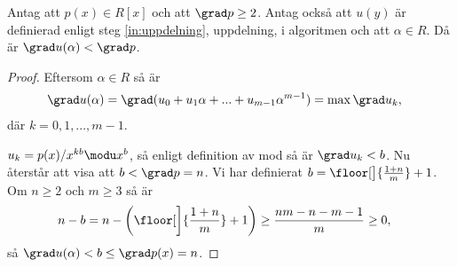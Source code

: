 \begin{lemma}
  \label{lemma:1}
  Antag att $p(x) \in R[x]$ och att $\grad p \geq 2$. Antag också att $u(y)$ är
  definierad enligt steg \ref{in:uppdelning}, uppdelning, i algoritmen och att
  $\alpha \in R$. Då är $\grad u(\alpha) < \grad p$.
\end{lemma}
\begin{proof}
  Eftersom $\alpha \in R$ så är
  \begin{align*}
    \grad u(\alpha) &= \grad (u_0 + u_1 \alpha + ... + u_{m-1}\alpha^{m-1}) = \max \grad u_k,
  \end{align*}
  där $k={0,1,...,m-1}$.

  \bigskip\noindent
  $u_k = p(x)/x^{k b} \modu x^b$, så enligt definition av mod så är $\grad u_k
  < b$. Nu återstår att visa att $b < \grad p = n$. Vi har definierat $b =
  \floor[\big]{\frac{1 + n}{m}} + 1$. Om $n \geq 2$ och $m \geq 3$ så är
  \begin{align*}
    n-b &= n - \left( \floor[\bigg]{\frac{1 + n}{m}} + 1 \right) \geq \frac{nm-n-m-1}{m} \geq 0,
  \end{align*}
  så $\grad u(\alpha) < b \leq \grad p(x) = n$.
\end{proof}

